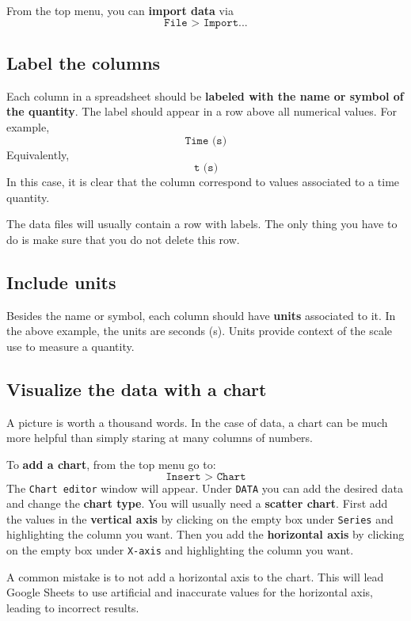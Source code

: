 From the top menu, you can \textbf{import data} via
\begin{equation}
    \texttt{File > Import...}
\end{equation}
%
\subsection{Label the columns}
%
Each column in a spreadsheet should be \textbf{labeled with the name or symbol of the quantity}. The label should appear in a row above all numerical values. For example,
\begin{equation}
    \texttt{Time (s)}
\end{equation}
Equivalently,
\begin{equation}
    \texttt{t (s)}
\end{equation}
In this case, it is clear that the column correspond to values associated to a time quantity.

The data files will usually contain a row with labels. The only thing you have to do is make sure that you do not delete this row.
%
\subsection{Include units}
%
Besides the name or symbol, each column should have \textbf{units} associated to it. In the above example, the units are seconds (s). Units provide context of the scale use to measure a quantity.
%
\subsection{Visualize the data with a chart}
%
A picture is worth a thousand words. In the case of data, a chart can be much more helpful than simply staring at many columns of numbers.

To \textbf{add a chart}, from the top menu go to:
\begin{equation}
    \texttt{Insert > Chart}
\end{equation}
The \texttt{Chart editor} window will appear. Under \texttt{DATA} you can add the desired data and change the \textbf{chart type}. You will usually need a \textbf{scatter chart}. First add the values in the \textbf{vertical axis} by clicking on the empty box under \texttt{Series} and highlighting the column you want. Then you add the \textbf{horizontal axis} by clicking on the empty box under \texttt{X-axis} and highlighting the column you want.

A common mistake is to not add a horizontal axis to the chart. This will lead Google Sheets to use artificial and inaccurate values for the horizontal axis, leading to incorrect results.
%
